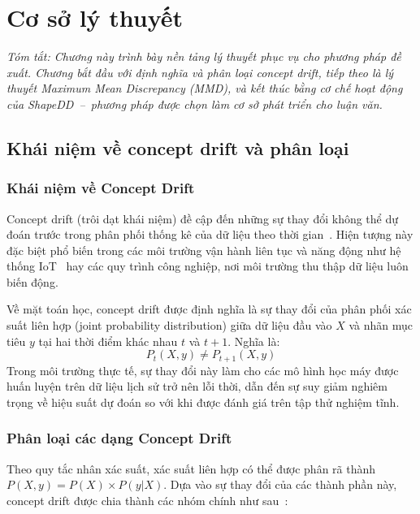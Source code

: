 \chapter{Cơ sở lý thuyết}
\label{chap:theoretical-foundation}

\textit{Tóm tắt: Chương này trình bày nền tảng lý thuyết phục vụ cho phương pháp đề xuất. Chương bắt đầu với định nghĩa và phân loại concept drift, tiếp theo là lý thuyết Maximum Mean Discrepancy (MMD), và kết thúc bằng cơ chế hoạt động của ShapeDD~--~phương pháp được chọn làm cơ sở phát triển cho luận văn.}

\section{Khái niệm về concept drift và phân loại}

\subsection{Khái niệm về Concept Drift}
Concept drift (trôi dạt khái niệm) đề cập đến những sự thay đổi không thể dự đoán trước trong phân phối thống kê của dữ liệu theo thời gian~\cite{schlimmer1986incremental}. Hiện tượng này đặc biệt phổ biến trong các môi trường vận hành liên tục và năng động như hệ thống IoT~\cite{ramakrishnan2014enabling} hay các quy trình công nghiệp, nơi môi trường thu thập dữ liệu luôn biến động.

Về mặt toán học, concept drift được định nghĩa là sự thay đổi của phân phối xác suất liên hợp (joint probability distribution) giữa dữ liệu đầu vào $X$ và nhãn mục tiêu $y$ tại hai thời điểm khác nhau $t$ và $t+1$. Nghĩa là: 
\begin{equation}
    P_t(X, y) \neq P_{t+1}(X, y)
\end{equation}
Trong môi trường thực tế, sự thay đổi này làm cho các mô hình học máy được huấn luyện trên dữ liệu lịch sử trở nên lỗi thời, dẫn đến sự suy giảm nghiêm trọng về hiệu suất dự đoán so với khi được đánh giá trên tập thử nghiệm tĩnh.

\subsection{Phân loại các dạng Concept Drift}
Theo quy tắc nhân xác suất, xác suất liên hợp có thể được phân rã thành $P(X, y) = P(X) \times P(y|X)$. Dựa vào sự thay đổi của các thành phần này, concept drift được chia thành các nhóm chính như sau~\cite{hovakimyan2024evolving}:

